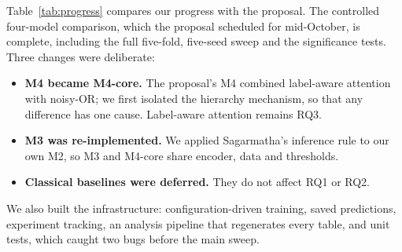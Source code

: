 \documentclass[11pt]{article}
\begin{document}
\begin{table}[t]
\centering\small
\setlength{\tabcolsep}{4pt}
\caption{Status of the work planned in the proposal.}
\label{tab:progress}
\end{table}

Table~\ref{tab:progress} compares our progress with the proposal. The
controlled four-model comparison, which the proposal scheduled for
mid-October, is complete, including the full five-fold, five-seed sweep and
the significance tests. Three changes were deliberate:
\begin{itemize}\setlength\itemsep{1pt}
\item \textbf{M4 became M4-core.} The proposal's M4 combined label-aware
attention with noisy-OR; we first isolated the hierarchy mechanism, so that
any difference has one cause. Label-aware attention remains RQ3.
\item \textbf{M3 was re-implemented.} We applied Sagarmatha's inference
rule to our own M2, so M3 and M4-core share encoder, data and thresholds.
\item \textbf{Classical baselines were deferred.} They do not affect RQ1 or
RQ2.
\end{itemize}
We also built the infrastructure: configuration-driven training, saved
predictions, experiment tracking, an analysis pipeline that regenerates every
table, and unit tests, which caught two bugs before the main sweep.

\end{document}
